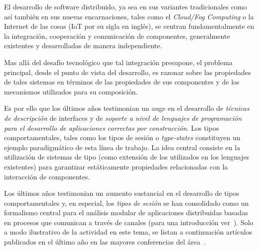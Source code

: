 El desarrollo de software distribuido, ya sea en sus variantes tradicionales
como así también en sus nuevas encarnaciones, tales como el \emph{Cloud/Fog
Computing} o la Internet de las cosas (IoT por su sigla en inglés), se
centran fundamentalmente en la integración, cooperación y comunicación de
componentes, generalmente existentes y desarrolladas de manera independiente.

Mas allá del desafío tecnológico que tal integración presupone, el
problema principal, desde el punto de vista del desarrollo, es  razonar sobre
las propiedades de tales sistemas en términos de las propiedades de sus
componentes y de los mecanismos utilizados para su composición.

Es por ello que los últimos años testimonian un auge en el desarrollo de
{\em técnicas de descripción} de interfaces y de {\em soporte a nivel de
lenguajes de programación para el desarrollo de aplicaciones correctas por
construcción}.  Los tipos comportamentales, tales como los tipos de
sesión o {\em type-states} constituyen un ejemplo paradigmático de esta
línea de trabajo. La idea central consiste en la utilización de sistemas de
tipo (como extensión de los utilizados en los lenguajes existentes) para
garantizar estáticamente propiedades relacionadas con la interacción de
componentes.

Los últimos años testimonian un aumento sustancial en el desarrollo de tipos
comportamentales y, en especial, los {\em tipos de sesión} se han consolidado
como un formalismo central para el análisis modular de aplicaciones
distribuidas basadas en procesos que comunican a través de canales (para una
introducción ver~\cite{HuttelEtAl16}). Solo a modo ilustrativo de la
actividad en este tema, se listan a continuación artículos publicados en el
último año en las mayores conferencias del
área~\cite{DBLP:journals/pacmpl/GhilezanPPSY21,
DBLP:journals/pacmpl/HinrichsenBK20, DBLP:journals/pacmpl/Castro-PerezY20,
DBLP:conf/ecoop/ImaiNYY19, DBLP:conf/ecoop/000119, DBLP:conf/esop/JongmansY20,
DBLP:conf/esop/VasconcelosCAM20, DBLP:conf/concur/Horne20,
DBLP:conf/concur/DasP20, DBHPS21,DBLP:conf/cc/Miu0Y021,
DBLP:journals/pacmpl/GriesemerHKLTTW20, DBLP:journals/pacmpl/MajumdarYZ20,
DBLP:conf/concur/InversoMPTT20}.

